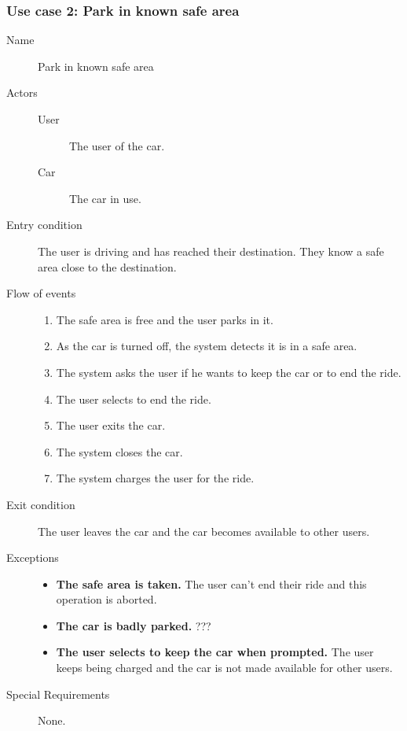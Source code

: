 	\subsubsection{Use case 2: Park in known safe area}
		\begin{description}
			\item[Name] Park in known safe area
			\item[Actors] \hfill
				\begin{description}
					\item[User] The user of the car.
					\item[Car] The car in use.
				\end{description}
			\item[Entry condition] The user is driving and has reached their destination. They know a safe area close to the destination.
			\item[Flow of events] \hfill
				\begin{enumerate}
					\item The safe area is free and the user parks in it.
					\item As the car is turned off, the system detects it is in a safe area.
					\item The system asks the user if he wants to keep the car or to end the ride.
					\item The user selects to end the ride.
					\item The user exits the car.
					\item The system closes the car.
					\item The system charges the user for the ride.
				\end{enumerate}
			\item[Exit condition] The user leaves the car and the car becomes available to other users.
			\item[Exceptions] \hfill
				\begin{itemize}
					\item \textbf{The safe area is taken.} The user can't end their ride and this operation is aborted.
					\item \textbf{The car is badly parked.} ??? %
					\item \textbf{The user selects to keep the car when prompted.} The user keeps being charged and the car is not made available for other users.
				\end{itemize}
			\item[Special Requirements] None. %
		\end{description}

